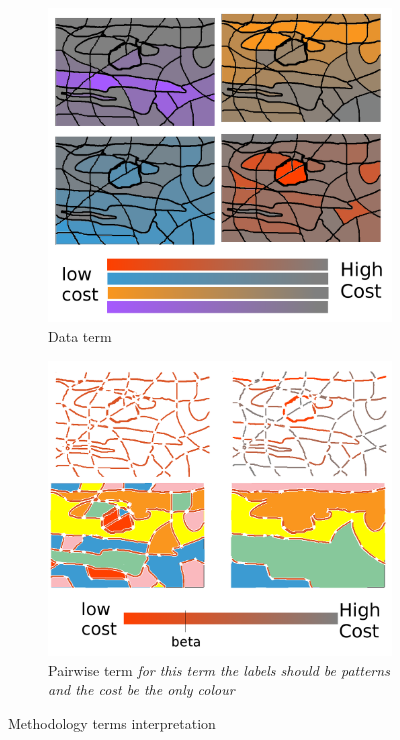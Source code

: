\begin{figure}
\begin{subfigure}[b]{0.39\textwidth}
        \includegraphics[width=\textwidth]{data}
        \caption[]%
        {{\small Data term}}    
        \label{fig:methodTerms:data}
    \end{subfigure}
    \hfill
    \begin{subfigure}[b]{0.39\textwidth}   
        \centering 
        \includegraphics[width=\textwidth]{smooth} \caption[]%
        {{\small Pairwise term \emph{for this term the labels should be patterns and the cost be the only colour}}}    
        \label{fig:methodTerms:boundary}
    \end{subfigure}
    \caption {\small Methodology terms interpretation} 
    \label{fig:methodterms}
\end{figure}

